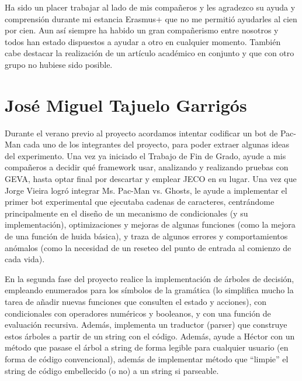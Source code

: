 Ha sido un placer trabajar al lado de mis compañeros y les agradezco su ayuda y comprensión durante mi estancia Erasmus+ que no me permitió ayudarles al cien por cien. Aun así siempre ha habido un gran compañerismo entre nosotros y todos han estado dispuestos a ayudar a otro en cualquier momento. También cabe destacar la realización de un artículo académico en conjunto y que con otro grupo no hubiese sido posible.


\section{José Miguel Tajuelo Garrigós}
Durante el verano previo al proyecto acordamos intentar codificar un bot de Pac-Man cada uno de los integrantes del proyecto, para poder extraer algunas ideas del experimento. Una vez ya iniciado el Trabajo de Fin de Grado, ayude a mis compañeros a decidir qué framework usar, analizando y realizando pruebas con GEVA, hasta optar final por descartar y emplear JECO en su lugar. Una vez que Jorge Vieira logró integrar Ms. Pac-Man vs. Ghosts, le ayude a implementar el primer bot experimental que ejecutaba cadenas de caracteres, centrándome principalmente en el diseño de un mecanismo de condicionales (y su implementación), optimizaciones y mejoras de algunas funciones (como la mejora de una función de huida básica), y traza de algunos errores y comportamientos anómalos (como la necesidad de un reseteo del punto de entrada al comienzo de cada vida).
 
En la segunda fase del proyecto realice la implementación de árboles de decisión, empleando enumerados para los símbolos de la gramática (lo simplifica mucho la tarea de añadir nuevas funciones que consulten el estado y acciones), con condicionales con operadores numéricos y booleanos, y con una función de evaluación recursiva. Además, implementa un traductor (parser) que construye estos árboles a partir de un string con el código. Además, ayude a Héctor con un método que pasase el árbol a string de forma legible para cualquier usuario (en forma de código convencional), además de implementar método que “limpie” el string de código embellecido (o no) a un string si parseable.
 
